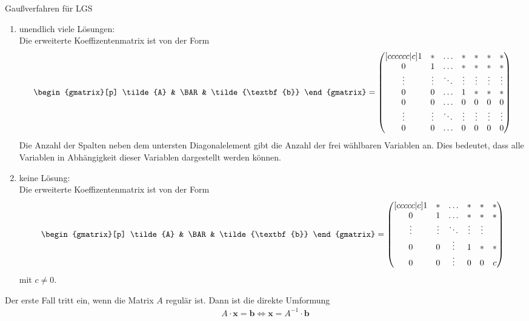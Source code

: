 \begin{mybox}{Gaußverfahren für LGS}
\begin{enumerate}
\item
unendlich viele Lösungen:\\
Die erweiterte Koeffizentenmatrix ist von der Form
\begin{align*}
\begin{gmatrix}[p]
\tilde{A} & \BAR & \tilde{\textbf{b}}
\end{gmatrix}
=
\begin{pmatrix}	[cccccc|c]
1 &  \ast  & \ldots & \ast & \ast& \ast & \ast\\
0  &  1 & \ldots & \ast & \ast& \ast & \ast\\
\vdots & \vdots & \ddots & \vdots & \vdots & \vdots & \vdots\\
0  &   0       &\ldots & 1& \ast& \ast & \ast\\
0 & 0 & \ldots & 0 & 0 & 0 & 0\\
\vdots & \vdots & \ddots & \vdots & \vdots & \vdots & \vdots\\
0 & 0 & \ldots & 0 & 0 & 0 &0
\end{pmatrix}
\end{align*}
Die Anzahl der Spalten neben dem untersten Diagonalelement gibt die Anzahl der frei wählbaren Variablen an.
Dies bedeutet, dass alle Variablen in Abhängigkeit dieser Variablen dargestellt werden können.
\item
keine Lösung:\\
Die erweiterte Koeffizentenmatrix ist von der Form
\begin{align*}
\begin{gmatrix}[p]
\tilde{A} & \BAR & \tilde{\textbf{b}}
\end{gmatrix}
=
\begin{pmatrix}	[ccccc|c]
1 &  \ast  & \ldots & \ast & \ast & \ast\\
0  &  1 & \ldots & \ast & \ast& \ast \\
\vdots & \vdots & \ddots & \vdots & \vdots\\
0  &   0       &\vdots & 1 & \ast& \ast\\
0 & 0 & \vdots &0 & 0 &c
\end{pmatrix}
\end{align*}
mit $c \neq 0$.
\end{enumerate}
\end{mybox}
Der erste Fall tritt ein, wenn die Matrix $A$ regulär ist.
Dann ist die direkte Umformung
\begin{align*}
A \cdot \textbf{x} = \textbf{b}
\Leftrightarrow
\textbf{x} = A^{-1} \cdot \textbf{b}
\end{align*} 
